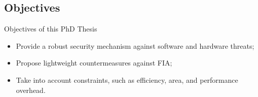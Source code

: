 \subsection{Objectives}
\begin{frame}{Objectives of this PhD Thesis}
    \begin{block}{}
        \begin{itemize}
            [triangle]
            \justifying
            \item Provide a robust security mechanism against software and hardware threats;
            \item Propose lightweight countermeasures against FIA;
            \item Take into account constraints, such as efficiency, area, and performance overhead.
        \end{itemize}
    \end{block}
\end{frame}
